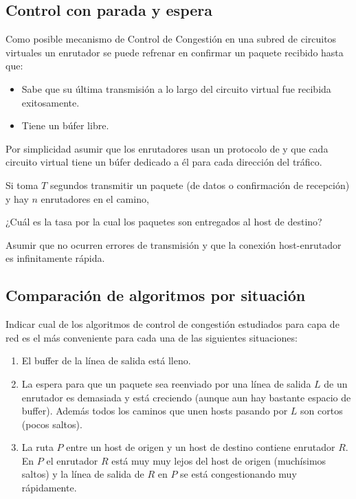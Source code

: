 \documentclass[12pt]{report}
\begin{document}
\begin{exer}
\subsection{Control con parada y espera \sthree}
Como posible mecanismo de Control de Congestión en una subred de circuitos virtuales
un enrutador se puede refrenar en confirmar un paquete recibido hasta que:

\begin{itemize}
\item Sabe que su última transmisión a lo largo del circuito virtual fue recibida exitosamente.
\item Tiene un búfer libre.
\end{itemize}

Por simplicidad asumir que los enrutadores usan un protocolo de  y que cada
circuito virtual tiene un búfer dedicado a él para cada dirección del tráfico.

Si toma $T$ segundos transmitir un paquete (de datos o confirmación de recepción) y hay $n$ enrutadores en el camino,

¿Cuál es la tasa por la cual los paquetes son entregados al host de destino?

Asumir que no ocurren errores de transmisión y que la conexión host-enrutador es infinitamente rápida.
\end{exer}

\begin{exer}
\subsection{Comparación de algoritmos por situación \sthree \steo}
Indicar cual de los algoritmos de control de congestión estudiados para capa de red es el más conveniente para cada una de las siguientes situaciones:

\begin{enumerate}
\item El buffer de la línea de salida está lleno.
\item La espera para que un paquete sea reenviado por una línea de salida $L$ de un enrutador es demasiada y está creciendo (aunque aun hay bastante espacio de buffer). Además todos los caminos que unen hosts pasando por $L$ son cortos (pocos saltos). 
\item La ruta $P$ entre un host de origen y un host de destino contiene enrutador $R$. En $P$ el enrutador $R$ está muy muy lejos del host de origen (muchísimos saltos) y la línea de salida de $R$ en $P$ se está congestionando muy rápidamente.
\end{enumerate}
\end{exer}
\end{document}
